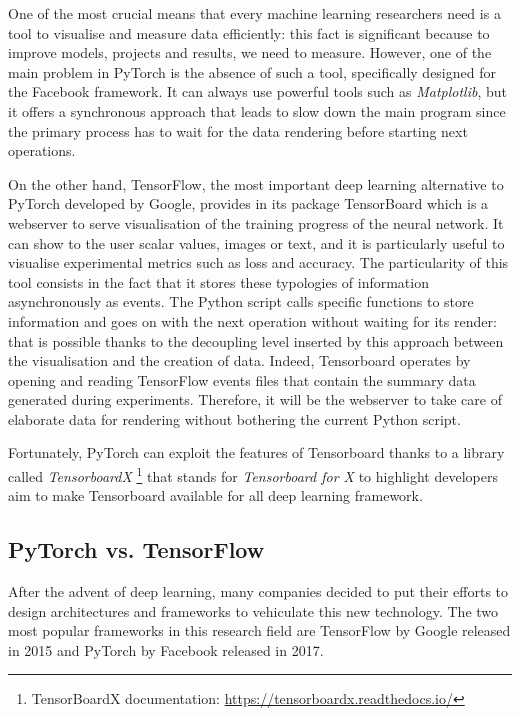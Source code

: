 One of the most crucial means that every machine learning researchers need is a tool to visualise and measure data efficiently: this fact is significant because to improve models, projects and results, we need to measure.
However, one of the main problem in PyTorch is the absence of such a tool, specifically designed for the Facebook framework.
It can always use powerful tools such as \textit{Matplotlib}, but it offers a synchronous approach that leads to slow down the main program since the primary process has to wait for the data rendering before starting next operations.

On the other hand, TensorFlow, the most important deep learning alternative to PyTorch developed by Google, provides in its package TensorBoard which is a webserver to serve visualisation of the training progress of the neural network.
It can show to the user scalar values, images or text, and it is particularly useful to visualise experimental metrics such as loss and accuracy.
The particularity of this tool consists in the fact that it stores these typologies of information asynchronously as events.
The Python script calls specific functions to store information and goes on with the next operation without waiting for its render: that is possible thanks to the decoupling level inserted by this approach between the visualisation and the creation of data.
Indeed, Tensorboard operates by opening and reading  TensorFlow events files that contain the summary data generated during experiments.
Therefore, it will be the webserver to take care of elaborate data for rendering without bothering the current Python script.

Fortunately, PyTorch can exploit the features of Tensorboard thanks to a library called \textit{TensorboardX} \footnote{TensorBoardX documentation: \href{https://tensorboardx.readthedocs.io/en/latest/index.html}{https://tensorboardx.readthedocs.io/}} that stands for \textit{Tensorboard for X} to highlight developers aim to make Tensorboard available for all deep learning framework.

\subsection{PyTorch vs. TensorFlow}

After the advent of deep learning, many companies decided to put their efforts to design architectures and frameworks to vehiculate this new technology.
The two most popular frameworks in this research field are TensorFlow \cite{abadi2016tensorflow} by Google released in 2015 and PyTorch \cite{paszke2017automatic}  by Facebook released in 2017.

